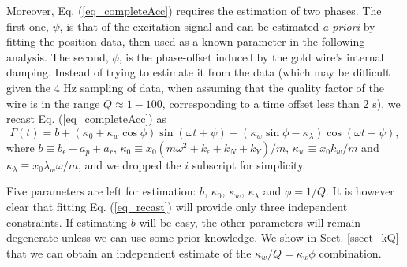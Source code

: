 \documentclass[12pt]{iopart}
\begin{document}
Moreover, Eq. (\ref{eq_completeAcc}) requires the estimation of two phases. The first one, $\psi$, is that of the excitation signal and can be estimated {\it a priori} by fitting the position data, then used as a known parameter in the following analysis. The second, $\phi$, is the phase-offset induced by the gold wire's internal damping. %
Instead of trying to estimate it from the data (which may be difficult given the 4 Hz sampling of data, when assuming that the quality factor of the wire is in the range $Q\approx 1-100$, corresponding to a time offset less than 2 s), we recast Eq. (\ref{eq_completeAcc}) as
\begin{equation} \label{eq_recast}
\Gamma(t) = b + \left(\kappa_0 + \kappa_w \cos\phi \right) \sin(\omega t + \psi) - \left(\kappa_w \sin\phi  - \kappa_\lambda \right) \cos(\omega t + \psi),
\end{equation}
where $b \equiv b_{\epsilon} + a_p + a_r$, $\kappa_0 \equiv x_0 (m \omega^2 + k_\epsilon + k_N + k_Y) / m$, $\kappa_w \equiv x_0 k_w / m$ and $\kappa_\lambda \equiv x_0 \lambda_w \omega / m$, and we dropped the $i$ subscript for simplicity. %

Five parameters are left for estimation: $b$, $\kappa_0$, $\kappa_w$, $\kappa_\lambda$ and $\phi=1/Q$. It is however clear that fitting Eq. (\ref{eq_recast}) will provide only three independent constraints. If estimating $b$ will be easy, the other parameters will remain degenerate unless we can use some prior knowledge. We show in Sect. \ref{ssect_kQ} that we can obtain an independent estimate of the $\kappa_w/Q = \kappa_w \phi$ combination.%

\end{document}
